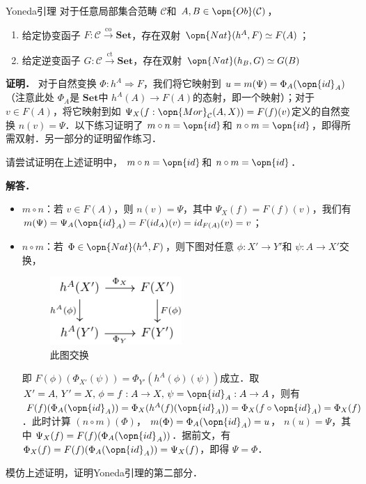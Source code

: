 \begin{theorem}{Yoneda引理}
对于任意局部集合范畴 $\mathcal{C}$和 $A,B\in\opn{Ob}(\mathcal{C})$，
\begin{enumerate}
\item 给定协变函子 $F:\mathcal{C}\overset{\text{co}}{\to}\mathbf{Set}$，存在双射 $\opn{Nat}(h^A,F)\simeq F(A)$；
\item 给定逆变函子 $G:\mathcal{C}\overset{\text{ct}}{\to}\mathbf{Set}$，存在双射 $\opn{Nat}(h_B,G)\simeq G(B)$
\end{enumerate}
\end{theorem}
\textbf{证明．}
对于自然变换 $\Phi:h^A\Rightarrow F$，我们将它映射到 $u=m(\Psi)=\Phi_A(\opn{id}_A)$（注意此处 $\Phi_A$是 $\mathbf{Set}$中 $h^A(A)\to F(A)$的态射，即一个映射）；对于 $v\in F(A)$，将它映射到如 $\Psi_X(f:\opn{Mor}_\mathcal{C}(A,X))=F(f)(v)$定义的自然变换 $n(v)=\Psi$．以下练习证明了 $m\circ n=\opn{id}$和 $n\circ m=\opn{id}$，即得所需双射．另一部分的证明留作练习．
\begin{exercise}{}
请尝试证明在上述证明中， $m\circ n=\opn{id}$和 $n\circ m=\opn{id}$．
\end{exercise}
\textbf{解答．}
\begin{itemize}
\item $m\circ n$：若 $v\in F(A)$，则 $n(v)=\Psi$，其中 $\Psi_X(f)=F(f)(v)$，我们有 $m(\Psi)=\Psi_A(\opn{id}_A)=F(id_A)(v)=id_{F(A)}(v)=v$；
\item $n\circ m$：若 $\Phi\in\opn{Nat}(h^A,F)$，则下图对任意 $\phi:X'\to Y'$和 $\psi:A\to X'$交换，
\begin{figure}[ht]
\centering
\includegraphics[width=5cm]{./figures/Cat3.pdf}
\caption{此图交换} \label{Cat_fig3}
\end{figure}
即 $F(\phi)(\Phi_{X'}(\psi))=\Phi_{Y'}(h^A(\phi)(\psi))$成立．取 $X'=A,\,Y'=X,\,\phi=f:A\to X,\,\psi=\opn{id}_A:A\to A$，则有 $F(f)(\Phi_A(\opn{id}_A))=\Phi_X(h^A(f)(\opn{id}_A))=\Phi_X(f\circ\opn{id}_A)=\Phi_X(f)$．此时计算 $(n\circ m)(\Phi)$， $m(\Phi)=\Phi_A(\opn{id}_A)=u$， $n(u)=\Psi$，其中 $\Psi_X(f)=F(f)(\Phi_A(\opn{id}_A))$．据前文，有 $\Phi_X(f)=F(f)(\Phi_A(\opn{id}_A))=\Psi_X(f)$，即得 $\Psi=\Phi$．
\end{itemize}
\begin{exercise}{}
模仿上述证明，证明Yoneda引理的第二部分．
\end{exercise}